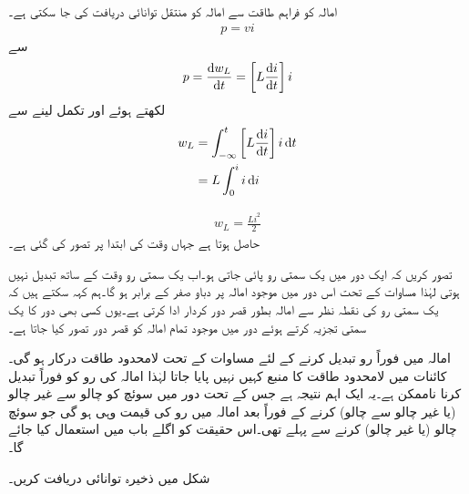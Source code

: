 امالہ کو فراہم طاقت سے امالہ کو منتقل توانائی  دریافت کی جا سکتی ہے۔
\begin{align}
p=vi
\end{align}
سے
\begin{align}\label{مساوات_امالہ_کو_مہیا_طاقت_الف}
p=\frac{\dif w_L}{\dif t}=\left[L \frac{\dif i}{\dif t}\right] i
\end{align}
لکھتے ہوئے اور تکمل لینے سے
\begin{align*}
w_L&=\int_{-\infty}^{t} \left[L\frac{\dif i}{\dif t}\right]i\dif t\\
&=L\int_{0}^{i} i \dif i
\end{align*}

\begin{align}
w_L=\frac{Li^2}{2}
\end{align}
حاصل ہوتا ہے جہاں وقت کی ابتدا  پر  تصور کی گئی ہے۔

تصور کریں کہ ایک دور میں یک سمتی رو پائی جاتی ہو۔اب یک سمتی رو وقت کے ساتھ تبدیل نہیں ہوتی لہٰذا مساوات  کے تحت اس دور میں موجود امالہ پر دباو صفر کے برابر ہو گا۔ہم کہہ سکتے ہیں کہ یک سمتی رو کی نقطہ نظر سے امالہ بطور قصر دور کردار ادا کرتی ہے۔یوں کسی بھی دور کا یک سمتی تجزیہ کرتے ہوئے دور میں موجود تمام امالہ کو قصر دور تصور کیا جاتا ہے۔

امالہ میں فوراً رو تبدیل کرنے کے لئے مساوات  کے تحت  لامحدود طاقت درکار ہو گی۔کائنات میں لامحدود طاقت کا منبع کہیں نہیں پایا جاتا لہٰذا امالہ کی رو کو فوراً تبدیل کرنا ناممکن ہے۔یہ ایک اہم نتیجہ ہے جس کے تحت دور میں سوئچ کو چالو سے غیر چالو (یا غیر چالو سے چالو) کرنے کے فوراً بعد امالہ میں رو کی قیمت وہی ہو گی جو سوئچ چالو (یا غیر چالو) کرنے سے پہلے تھی۔اس حقیقت کو اگلے باب میں استعمال کیا جائے گا۔

شکل  میں ذخیرہ توانائی دریافت کریں۔

